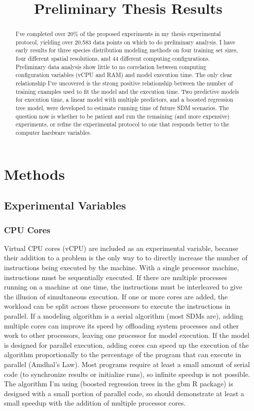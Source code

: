 \documentclass[a4paper]{article}
\title{Preliminary Thesis Results}
\begin{document}
\maketitle

\begin{abstract}
I've completed over 20\% of the proposed experiments in my thesis experimental protocol, yielding over 20,583 data points on which to do preliminary analysis. I have early results for three species distribution modeling methods on four training set sizes, four different spatial resolutions, and 44 different computing configurations. Preliminary data analysis show little to no correlation between computing configuration variables (vCPU and RAM) and model execution time.   The only clear relationship I've uncovered is the strong positive relationship between the number of training examples used to fit the model and the execution time.  Two predictive models for execution time, a linear model with multiple predictors, and a boosted regression tree model, were developed to estimate running time of future SDM scenarios.  The question now is whether to be patient and run the remaining (and more expensive) experiments, or refine the experimental protocol to one that responds better to the computer hardware variables.
\end{abstract}

\section{Methods}

\subsection{Experimental Variables}
\subsubsection{CPU Cores}
Virtual CPU cores (vCPU) are included as an experimental variable, because their addition to a problem is the only way to to directly increase the number of instructions being executed by the machine.  With a single processor machine, instructions must be sequentially executed.  If there are multiple processes running on a machine at one time, the instructions must be interleaved to give the illusion of simultaneous execution.  If one or more cores are added, the workload can be split across these processors to execute the instructions in parallel.  If a modeling algorithm is a serial algorithm (most SDMs are), adding multiple cores can improve its speed by offloading system processes and other work to other processors, leaving one processor for model execution.  If the model is designed for parallel execution, adding cores can speed up the execution of the algorithm proportionally to the percentage of the program that can execute in parallel (Amdhal's Law).  Most programs require at least a small amount of serial code (to synchronize results or initialize runs), so infinite speedup is not possible.  The algorithm I'm using (boosted regression trees in the gbm R package) is designed with a small portion of parallel code, so should demonstrate at least a small speedup  with the addition of multiple processor cores.
\end{document}
